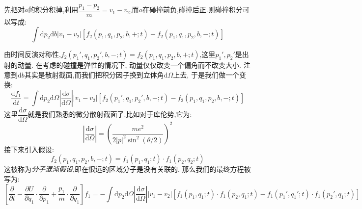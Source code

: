     先把对$a$的积分积掉,利用$\dfrac{p_1-p_2}{m}=v_1-v_2$,而$a$在碰撞前负,碰撞后正.则碰撞积分可以写成:
    \[\int \mathrm{d} p_2 \mathrm{d} b \left\vert v_1-v_2 \right\vert \left[ f_2(p_1,q_1,p_2,b,+;t)-f_2(p_1,q_1,p_2,b,-;t) \right] \]

    由时间反演对称性,$f_2(p_1',q_1,p_2',b,-;t)=f_2(p_1,q_1,p_2,b,+;t)$,这里$p_1',p_2'$是出射的动量. 在考虑的碰撞是弹性的情况下, 动量仅仅改变一个偏角而不改变大小. 注意到$\mathrm{d} b$其实是散射截面,而我们把积分因子换到立体角$\mathrm{d} \Omega$上去, 于是我们做一个变换:
    \begin{equation}
      \dfrac{\mathrm{d}f_1}{\mathrm{d} t}=\int \mathrm{d} p_2 \mathrm{d} \Omega \left\vert \dfrac{\mathrm{d}\sigma}{\mathrm{d} \Omega} \right\vert \left\vert v_1-v_2 \right\vert \left[ f_2(p_1',q_1,p_2',b,-;t)-f_2(p_1,q_1,p_2,b,-;t) \right] 
    \end{equation}
    这里$\dfrac{\mathrm{d}\sigma}{\mathrm{d} \Omega}$就是我们熟悉的微分散射截面了.比如对于库伦势,它为:
    \[\left\vert \dfrac{\mathrm{d}\sigma}{\mathrm{d} \Omega} \right\vert =\left( \frac{me^{2}}{2\left\vert p \right\vert ^{2}\sin ^{2}(\theta / 2)} \right) ^{2}\]
    接下来引入假设:
    \begin{equation}
      f_2(p_1,q_1,p_2,b,-;t)=f_1(p_1,q_1;t)\cdot f_1(p_2,q_2;t)
    \end{equation}
    这被称为\emph{分子混沌假设},即在很远的区域分子是没有关联的. 那么我们的最终方程被写为:
    \begin{equation}
      \left[ \dfrac{\partial }{\partial t}-\dfrac{\partial U}{\partial q_1}\cdot \dfrac{\partial }{\partial p_1}+\frac{p_1}{m}\cdot \dfrac{\partial }{\partial q_1} \right] f_1=-\int \mathrm{d} p_2 \mathrm{d} \Omega \left\vert \dfrac{\mathrm{d}\sigma}{\mathrm{d} \Omega} \right\vert \left\vert v_1-v_2 \right\vert \left[ f_1(p_1,q_1;t)\cdot f_1(p_2,q_1;t)-f_1(p_1',q_1';t)\cdot f_1(p_2',q_1;t) \right] 
    \end{equation}
    
